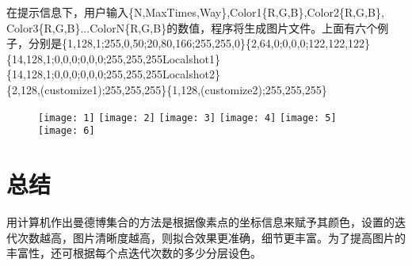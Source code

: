 \documentclass{ctexart}
\begin{document}
在提示信息下，用户输入\{N,MaxTimes,Way\},Color1\{R,G,B\},Color2\{R,G,B\},\\Color3\{R,G,B\}...ColorN\{R,G,B\}的数值，程序将生成图片文件。上面有六个例子，分别是\{{1,128,1};{255,0,50};{20,80,166};{255,255,0}\}\{{2,64,0};{0,0,0};{122,122,122}\}\\\{{14,128,1};{0,0,0};{0,0,0};{255,255,255}Localshot1\}\{{14,128,1};{0,0,0};{0,0,0};{255,255,255}Localshot2\}\\\{{2,128,(customize1)};{255,255,255}\}\{{1,128,(customize2)};{255,255,255}\}

\begin{figure}
\texttt{[image: 1]}
\texttt{[image: 2]}
\texttt{[image: 3]}
\texttt{[image: 4]}
\texttt{[image: 5]}
\texttt{[image: 6]}
\end{figure}

\section{总结}

用计算机作出曼德博集合的方法是根据像素点的坐标信息来赋予其颜色，设置的迭代次数越高，图片清晰度越高，则拟合效果更准确，细节更丰富。为了提高图片的丰富性，还可根据每个点迭代次数的多少分层设色。



\end{document}

